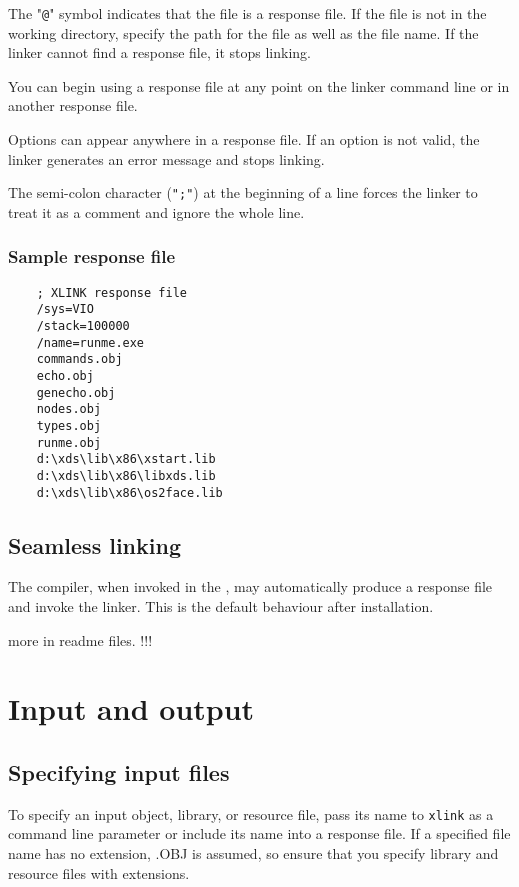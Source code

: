  The "\verb'@'" symbol indicates that the file is a response file. If the file is not
 in the working directory, specify the path for the file as well as the file
 name. If the linker cannot find a response file, it stops linking.

 You can begin using a response file at any point on the linker command
 line or in another response file.

 Options can appear anywhere in a response file. If an option is not
 valid, the linker generates an error message and stops linking.

 The semi-colon character (\verb'";"') at the beginning of a line forces
 the linker to treat it as a comment and ignore the whole line.

\subsubsection{Sample response file}

\begin{verbatim}
    ; XLINK response file
    /sys=VIO
    /stack=100000
    /name=runme.exe
    commands.obj
    echo.obj
    genecho.obj
    nodes.obj
    types.obj
    runme.obj
    d:\xds\lib\x86\xstart.lib
    d:\xds\lib\x86\libxds.lib
    d:\xds\lib\x86\os2face.lib
\end{verbatim}

\subsection{Seamless linking}
\label{link:seamless}

 The compiler, when invoked in the ,
 may automatically produce a response file and invoke the linker.
 This is the default behaviour after \XDS{} installation.

\havetowrite more in readme files. !!!

\section{Input and output}

\subsection{Specifying input files}

 To specify an input object, library, or resource file,
 pass its name to \verb'xlink'
 as a command line parameter or include its name into a response file.
 If a specified file name has no extension, .OBJ is assumed, so ensure
 that you specify library and resource files with extensions.

